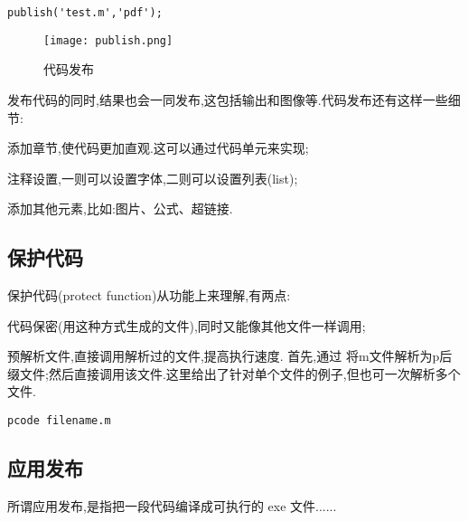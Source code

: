   \vspace{-0.8cm}
  \begin{lstlisting}[caption = 代码发布]
    publish('test.m','pdf');
  \end{lstlisting}

\myenddot

\begin{figure}[htbp]
  \centering
  \texttt{[image: publish.png]}
  \caption{代码发布}
\end{figure}

发布代码的同时,结果也会一同发布,这包括输出和图像等.代码发布还有这样一些细节:
\begindot
  \item 添加章节,使代码更加直观.这可以通过代码单元来实现;
  \item 注释设置,一则可以设置字体,二则可以设置列表(list);
  \item 添加其他元素,比如:图片、公式、超链接.
\myenddot




\subsection{保护代码}
保护代码(protect function)从功能上来理解,有两点:
\begindot
  \item 代码保密(用这种方式生成的文件),同时又能像其他文件一样调用;
  \item 预解析文件,直接调用解析过的文件,提高执行速度.
\myenddot
首先,通过  将m文件解析为p后缀文件;然后直接调用该文件.这里给出了针对单个文件的例子,但也可一次解析多个文件.

  \vspace{-0.8cm}
  \begin{lstlisting}[caption = 保护代码]
    pcode filename.m
  \end{lstlisting}




\subsection{应用发布}
 所谓应用发布,是指把一段代码编译成可执行的 exe 文件......



